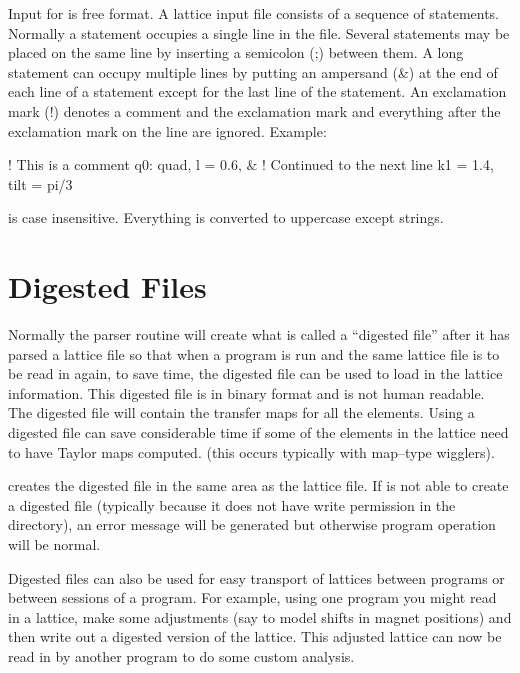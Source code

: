 Input for \bmad is free format. A \bmad lattice input file consists
of a sequence of statements. Normally a statement occupies a single
line in the file. Several statements may be placed on the same line by
inserting a semicolon (;) between them. A long statement can occupy
multiple lines by putting an ampersand (\&) at the end of each line of
a statement except for the last line of the statement. An
exclamation mark (!) denotes a comment and the exclamation mark and
everything after the exclamation mark on the line are ignored. Example:
\begin{example}
  ! This is a comment
  q0: quad, l = 0.6, &     ! Continued to the next line
            k1 = 1.4, tilt = pi/3
\end{example}
\bmad is case insensitive. Everything is converted to uppercase except
strings.

\section{Digested Files}
\label{s:lattice_files}

Normally the \bmad parser routine will create what is called a
``digested file'' after it has parsed a lattice file so that when a
program is run and the same lattice file is to be read in again, to save
time, the digested file can be used to load in the lattice information.
This digested file is in binary format and is not human readable. The
digested file will contain the transfer maps for all the elements. 
Using a digested file can save considerable time if some of the
elements in the lattice need to have Taylor maps computed.
(this occurs typically with map--type wigglers).

\bmad creates the digested file in the same area as the lattice file.
If \bmad is not able to create a digested file (typically because it
does not have write permission in the directory), an error message will
be generated but otherwise program operation will be normal.

Digested files can also be used for easy transport of lattices between
programs or between sessions of a program. For example, using one
program you might read in a lattice, make some adjustments (say to model
shifts in magnet positions) and then write out a digested version of the
lattice. This adjusted lattice can now be read in by another program to
do some custom analysis.

